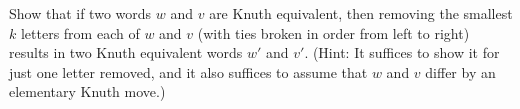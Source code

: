 \documentclass[12pt]{memoir}
\begin{document}
\begin{Ej}[7(a)]
    Show that if two words $w$ and $v$ are Knuth equivalent, then removing the smallest $k$
    letters from each of $w$ and $v$ (with ties broken in order from left to right) results in two Knuth
    equivalent words $w'$ and $v'$. (Hint: It suﬃces to show it for just one letter removed, and it also
    suﬃces to assume that $w$ and $v$ diﬀer by an elementary Knuth move.)
\end{Ej}

\begin{ptcbr}
   
\end{ptcbr}
\end{document}
